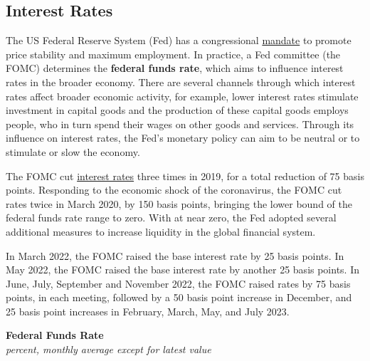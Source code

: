 \documentclass{report}
\begin{document}
{\begin{minipage}{0.76\textwidth}
\subsection*{Interest Rates}
\hypertarget{capint}{\label{capint}}
\small The US Federal Reserve System (Fed) has a congressional \href{https://www.federalreserve.gov/faqs/money_12848.htm}{mandate} to promote price stability and maximum employment. In practice, a Fed committee (the FOMC) determines the \textbf{federal funds rate}, which aims to influence interest rates in the broader economy. There are several channels through which interest rates affect broader economic activity, for example, lower interest rates stimulate investment in capital goods and the production of these capital goods employs people, who in turn spend their wages on other goods and services. Through its influence on interest rates, the Fed's monetary policy can aim to be neutral or to stimulate or slow the economy.

The FOMC cut \href{https://www.federalreserve.gov/releases/h15/}{interest rates} three times in 2019, for a total reduction of 75 basis points. Responding to the economic shock of the coronavirus, the FOMC cut rates twice in March 2020, by 150 basis points, bringing the lower bound of the federal funds rate range to zero. With at near zero, the Fed adopted several additional measures to increase liquidity in the global financial system.

In March 2022, the FOMC raised the base interest rate by 25 basis points. In May 2022, the FOMC raised the base interest rate by another 25 basis points. In June, July, September and November 2022, the FOMC raised rates by 75 basis points, in each meeting, followed by a 50 basis point increase in December, and 25 basis point increases in February, March, May, and July 2023. 
\vspace{2mm}

\normalsize \textbf{Federal Funds Rate}\\
\footnotesize{\textit{percent, monthly average except for latest value}}
\vspace{5.5cm}


\end{minipage}}
\end{document}
